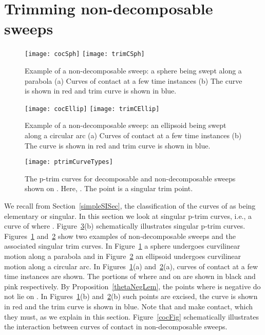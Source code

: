 \documentclass{elsart5p}
\begin{document}
\section{Trimming non-decomposable sweeps} \label{nonDecompSec}

\begin{figure}
 \centering
 \texttt{[image: cocSph]}
 \texttt{[image: trimCSph]}
 \caption{Example of a non-decomposable sweep: a sphere being swept along a parabola (a) Curves of contact at a few time instances (b) The curve  is shown in red and trim curve is shown in blue.}
 \label{nonDecompSphereFig}
\end{figure}

\begin{figure}
 \centering
 \texttt{[image: cocEllip]}
 \texttt{[image: trimCEllip]}
  \caption{Example of a non-decomposable sweep: an ellipsoid being swept along a circular arc (a) Curves of contact at a few time instances (b) The curve  is shown in red and trim curve is shown in blue.}
 \label{nonDecompEllipseFig}
\end{figure}

\begin{figure}
 \centering
 \texttt{[image: ptrimCurveTypes]}
 \caption{The p-trim curves for decomposable and non-decomposable sweeps shown on .  Here, 
. The point  is a singular trim point.}
 \label{ptrimCurveFig}
\end{figure}

We recall from Section~\ref{simpleSISec}, the classification
of the curves of  as being elementary or singular. In this
section we look at singular p-trim curves, i.e., a curve  of 
where .
Figure~\ref{ptrimCurveFig}(b) schematically illustrates singular p-trim curves.
Figures~\ref{nonDecompSphereFig} and~\ref{nonDecompEllipseFig} show two 
examples of non-decomposable sweeps and the associated singular trim curves.
In Figure~\ref{nonDecompSphereFig} a sphere undergoes curvilinear motion 
along a parabola and in Figure~\ref{nonDecompEllipseFig} an ellipsoid undergoes 
curvilinear motion along a circular arc.  In Figures~\ref{nonDecompSphereFig}(a) 
and~\ref{nonDecompEllipseFig}(a), curves of 
contact at a few time instances are shown. The portions of  where  
and  on  are shown in black and pink respectively.  
By Proposition~\ref{thetaNegLem}, the points where  is negative do not lie on . 
In Figures~\ref{nonDecompSphereFig}(b) and~\ref{nonDecompEllipseFig}(b) such points are excised,  
the curve  is shown in red and the trim curve  is 
shown in blue.  Note that  and  make contact, which 
they must, as we explain in this 
section.  Figure~\ref{cocFig} schematically illustrates the interaction between curves of contact in 
non-decomposable sweeps.  
\end{document}
